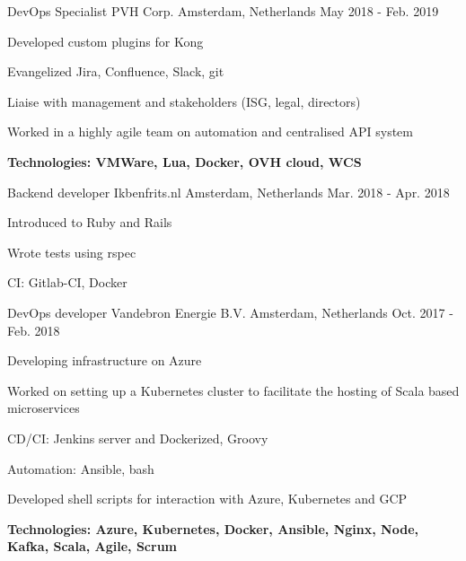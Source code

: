 


\begin{cventries}

\cventry
{DevOps Specialist} %
{PVH Corp.} %
{Amsterdam, Netherlands} %
{May 2018 - Feb. 2019} %
{ %
	\begin{cvitems}
		\item {Developed custom plugins for Kong}
		\item {Evangelized Jira, Confluence, Slack, git}
		\item {Liaise with management and stakeholders (ISG, legal, directors)}
		\item {Worked in a highly agile team on automation and centralised API system}
		\item {\bfseries{Technologies:} VMWare, Lua, Docker, OVH cloud, WCS}
	\end{cvitems}
}

\cventry
{Backend developer} %
{Ikbenfrits.nl} %
{Amsterdam, Netherlands} %
{Mar. 2018 - Apr. 2018} %
{ %
\begin{cvitems}
\item {Introduced to Ruby and Rails}
\item {Wrote tests using rspec}
\item {CI: Gitlab-CI, Docker}
\end{cvitems}
}


\cventry
{DevOps developer} %
{Vandebron Energie B.V.} %
{Amsterdam, Netherlands} %
{Oct. 2017 - Feb. 2018} %
{ %
\begin{cvitems}
\item {Developing infrastructure on Azure}
\item {Worked on setting up a Kubernetes cluster to facilitate the hosting of Scala based microservices}
\item {CD/CI: Jenkins server and Dockerized, Groovy}
\item {Automation: Ansible, bash}
\item {Developed shell scripts for interaction with Azure, Kubernetes and GCP}
\item {\bfseries{Technologies:} Azure, Kubernetes, Docker, Ansible, Nginx, Node, Kafka, Scala, Agile, Scrum}
\end{cvitems}
}


\end{cventries}
